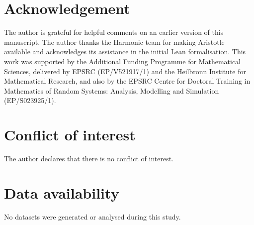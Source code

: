 \documentclass{article}
\theoremstyle{plain}
\theoremstyle{definition}
\begin{document}
\section*{Acknowledgement}
The author is grateful for helpful comments on an earlier version of this manuscript.
The author thanks the Harmonic team for making Aristotle~\cite{achim2025aristotle} available and acknowledges its assistance in the initial Lean formalisation.
This work was supported by the Additional Funding Programme for Mathematical Sciences, delivered by EPSRC (EP/V521917/1) and the Heilbronn Institute for Mathematical Research,
and also by the EPSRC Centre for Doctoral Training in Mathematics of Random Systems: Analysis, Modelling and Simulation (EP/S023925/1).


\section*{Conflict of interest}

The author declares that there is no conflict of interest.

\section*{Data availability}

No datasets were generated or analysed during this study.



\end{document}
